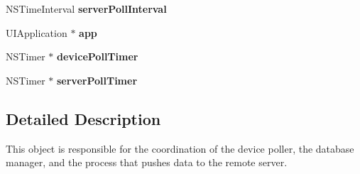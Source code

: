 \begin{DoxyCompactItemize}
\item 
\hypertarget{interface_background_scheduler_a6a4ebd391d86c9779122136b6c4dfc1c}{N\-S\-Time\-Interval {\bfseries server\-Poll\-Interval}}\label{interface_background_scheduler_a6a4ebd391d86c9779122136b6c4dfc1c}

\item 
\hypertarget{interface_background_scheduler_a8c133b6375de7c3e0cda3ac605ad2029}{U\-I\-Application $\ast$ {\bfseries app}}\label{interface_background_scheduler_a8c133b6375de7c3e0cda3ac605ad2029}

\item 
\hypertarget{interface_background_scheduler_a9dee3016296e3a529451c25b426b8923}{N\-S\-Timer $\ast$ {\bfseries device\-Poll\-Timer}}\label{interface_background_scheduler_a9dee3016296e3a529451c25b426b8923}

\item 
\hypertarget{interface_background_scheduler_ab78e335cbdbd2c276c299380a982f0e4}{N\-S\-Timer $\ast$ {\bfseries server\-Poll\-Timer}}\label{interface_background_scheduler_ab78e335cbdbd2c276c299380a982f0e4}

\end{DoxyCompactItemize}


\subsection{Detailed Description}
This object is responsible for the coordination of the device poller, the database manager, and the process that pushes data to the remote server. 

